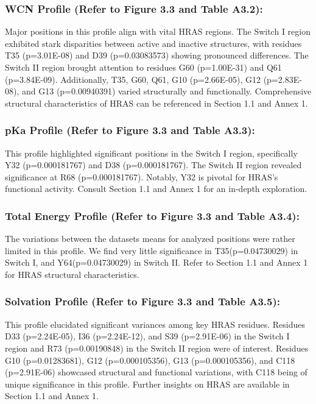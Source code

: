 \documentclass{article}
\begin{document}
\subsubsection{\textbf{WCN Profile} (Refer to Figure 3.3 and Table A3.2):}

Major positions in this profile align with vital HRAS regions. The Switch I region exhibited stark disparities between active and inactive structures, with residues T35 (p=3.01E-08) and D39 (p=0.03083573) showing pronounced differences. The Switch II region brought attention to residues G60 (p=1.00E-31) and Q61 (p=3.84E-09). Additionally, T35, G60, Q61, G10 (p=2.66E-05), G12 (p=2.83E-08), and G13 (p=0.00940391) varied structurally and functionally. Comprehensive structural characteristics of HRAS can be referenced in Section 1.1 and Annex 1.

\subsubsection{\textbf{pKa Profile} (Refer to Figure 3.3 and Table A3.3):}

This profile highlighted significant positions in the Switch I region, specifically Y32 (p=0.000181767) and D38 (p=0.000181767). The Switch II region revealed significance at R68 (p=0.000181767). Notably, Y32 is pivotal for HRAS's functional activity. Consult Section 1.1 and Annex 1 for an in-depth exploration.

\subsubsection{\textbf{Total Energy Profile} (Refer to Figure 3.3 and Table A3.4):}

The variations between the datasets means for analyzed positions were rather limited in this profile. We find very little significance in T35(p=0.04730029) in Switch I, and Y64(p=0.04730029) in Switch II. Refer to Section 1.1 and Annex 1 for HRAS structural characteristics.

\subsubsection{\textbf{Solvation Profile} (Refer to Figure 3.3 and Table A3.5):}

This profile elucidated significant variances among key HRAS residues. Residues D33 (p=2.24E-05), I36 (p=2.24E-12), and S39 (p=2.91E-06) in the Switch I region and R73 (p=0.00190848) in the Switch II region were of interest. Residues G10 (p=0.01283681), G12 (p=0.000105356), G13 (p=0.000105356), and C118 (p=2.91E-06) showcased structural and functional variations, with C118 being of unique significance in this profile. Further insights on HRAS are available in Section 1.1 and Annex 1.
\end{document}
